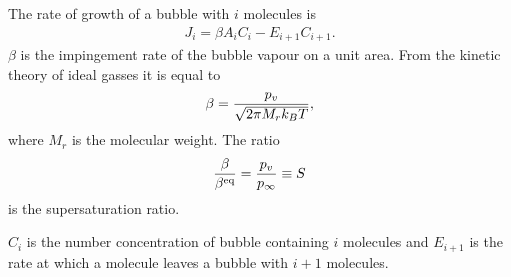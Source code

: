 The rate of growth of a bubble with $i$ molecules is
\begin{align}
  J_i = \beta  A_i C_i - E_{i+1} C_{i+1}. \label{eqn:Jn}
\end{align}
$\beta$ is the impingement rate of the bubble vapour on a unit area.
From the kinetic theory of ideal gasses it is equal to 
\begin{align}
\beta = \frac{p_v}{\sqrt{2\pi M_r k_B T}}, \label{eqn:nuc:beta}
\end{align}
where  $M_r$ is the molecular weight.
The ratio 
 \begin{align}
\frac{\beta}{\beta^{\text{eq}}} = \frac{p_v}{p_\infty} \equiv  S
\end{align}
is the  supersaturation ratio.

$C_i$ is the number concentration of bubble containing $i$ molecules and $E_{i+1}$ is the rate at which a molecule leaves a bubble with $i+1$ molecules.


